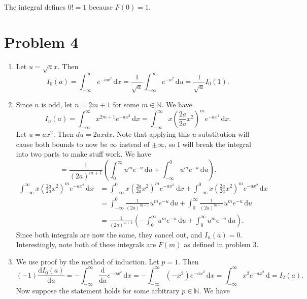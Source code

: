 \documentclass[11pt, letterpaper]{article}
\begin{document}
The integral defines $0! = 1$ because $F(0)=1$.
\section*{Problem 4}
\begin{enumerate}
	\item Let $u=\sqrt{a} x$. Then
\[
	I_0(a)=\int_{-\infty }^{\infty } e^{-ax^2}  \,\mathrm{d} x=\frac{1}{\sqrt{a} } \int_{-\infty }^{\infty } e^{-u^2}  \,\mathrm{d} u=\frac{1}{\sqrt{a} } I_0(1)
.\]
	\item Since $n$ is odd, let $n=2m+1$ for some $m\in\mathbb{N}$. We have
		\[
			I_n(a)=\int_{-\infty }^{\infty } x^{2m+1} e^{-ax^2}  \,\mathrm{d} x=\int_{-\infty }^{\infty } x\left( \frac{2a}{2a} x^2 \right)^{m}  e^{-ax^2}  \,\mathrm{d} x
		.\]
		Let $u=ax^2$. Then $du=2axdx$. Note that applying this $u$-substitution will cause both bounds to now be $\infty $ instead of $\pm \infty $, so I will break the integral into two parts to make stuff work. We have
		\[
			=\frac{1}{\left( 2a \right)^{m+1} } \left( \int_{0}^{\infty } u^me^{-u}  \,\mathrm{d} u+\int_{-\infty }^{0} u^me^{-u}  \,\mathrm{d} u \right)
		.\]
		\begin{align*}
			\int_{-\infty }^{\infty } x\left( \frac{2a}{2a} x^2 \right)^{m}  e^{-ax^2}  \,\mathrm{d} x&=\int_{-\infty }^{0} x\left( \frac{2a}{2a} x^2 \right)^m e^{-ax^2}  \,\mathrm{d} x+\int_{-\infty }^{0} x\left( \frac{2a}{2a} x^2 \right)^m e^{-ax^2}  \,\mathrm{d} x\\
														  &=\int_{-\infty }^{0} \frac{1}{\left( 2a \right)^{m+1} } u^{m} e^{-u}  \,\mathrm{d} u+\int_{0}^{\infty } \frac{1}{\left( 2a \right)^{m+1} } u^{m} e^{-u}  \,\mathrm{d} u\\
														  &=\frac{1}{\left( 2a \right) ^{m+1} } \left( -\int_{0}^{\infty } u^m e^{-u}  \,\mathrm{d} u+\int_{0}^{\infty } u^m e^{-u}  \,\mathrm{d} u \right)
		.\end{align*}
		Since both integrals are now the same, they cancel out, and $I_n(a)=0$. Interestingly, note both of these integrals are $F(m)$ as defined in problem 3.
	\item We use proof by the method of induction. Let $p=1$. Then
		\[
			(-1) \frac{\mathrm{d}I_0(a)}{\mathrm{d}a} = -\int_{-\infty }^{\infty } \frac{\mathrm{d}}{\mathrm{d}a} e^{-ax^2}  \,\mathrm{d} x=-\int_{-\infty }^{\infty } \left( -x^2 \right) e^{-ax^2}  \,\mathrm{d} x=\int_{-\infty }^{\infty } x^2e^{-ax^2}  \,\mathrm{d} =I_2(a)
		.\]
		Now suppose the statement holds for some arbitrary $p\in\mathbb{N} $. We have
		\[
\]
\end{enumerate}
\end{document}
